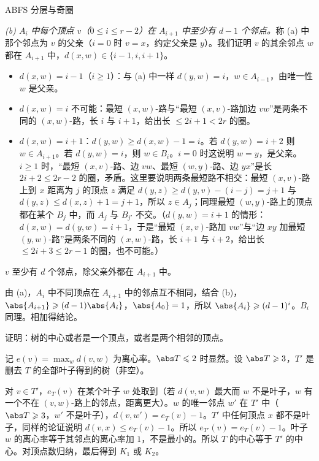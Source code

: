 \begin{exercises}{A}{BFS 分层与奇圈}
\begin{solution}
\emph{(b) $A_i$ 中每个顶点 $v$（$0\leqslant i\leqslant r-2$）在 $A_{i+1}$ 中至少有 $d-1$ 个邻点。}称 (a) 中那个邻点为 $v$ 的父亲（$i=0$ 时 $v=x$，约定父亲是 $y$）。我们证明 $v$ 的其余邻点 $w$ 都在 $A_{i+1}$ 中，$d(x,w)\in\{i-1,i,i+1\}$。
\begin{itemize}
\item $d(x,w)=i-1$（$i\geqslant1$）：与 (a) 中一样 $d(y,w)=i$，$w\in A_{i-1}$，由唯一性 $w$ 是父亲。
\item $d(x,w)=i$ 不可能：最短 $(x,w)$-路与“最短 $(x,v)$-路加边 $vw$”是两条不同的 $(x,w)$-路，长 $i$ 与 $i+1$，给出长 $\leqslant2i+1<2r$ 的圈。
\item $d(x,w)=i+1$：$d(y,w)\geqslant d(x,w)-1=i$。若 $d(y,w)=i+2$ 则 $w\in A_{i+1}$。若 $d(y,w)=i$，则 $w\in B_i$。$i=0$ 时这说明 $w=y$，是父亲。$i\geqslant1$ 时，“最短 $(x,v)$-路、边 $vw$、最短 $(w,y)$-路、边 $yx$”是长 $2i+2\leqslant2r-2$ 的圈，矛盾。这里要说明两条最短路不相交：最短 $(x,v)$-路上到 $x$ 距离为 $j$ 的顶点 $z$ 满足 $d(y,z)\geqslant d(y,v)-(i-j)=j+1$ 与 $d(y,z)\leqslant d(x,z)+1=j+1$，所以 $z\in A_j$；同理最短 $(w,y)$-路上的顶点都在某个 $B_j$ 中，而 $A_j$ 与 $B_{j'}$ 不交。（$d(y,w)=i+1$ 的情形：$d(x,w)=d(y,w)=i+1$，于是“最短 $(x,v)$-路加 $vw$”与“边 $xy$ 加最短 $(y,w)$-路”是两条不同的 $(x,w)$-路，长 $i+1$ 与 $i+2$，给出长 $\leqslant2i+3\leqslant2r-1$ 的圈，也不可能。）
\end{itemize}
$v$ 至少有 $d$ 个邻点，除父亲外都在 $A_{i+1}$ 中。

由 (a)，$A_i$ 中不同顶点在 $A_{i+1}$ 中的邻点互不相同，结合 (b)，$\abs{A_{i+1}}\geqslant(d-1)\abs{A_i}$，$\abs{A_0}=1$，所以 $\abs{A_i}\geqslant(d-1)^i$。$B_i$ 同理。相加得结论。
\end{solution}

\item\label{ex:distance-layers:A4} 证明：树的中心或者是一个顶点，或者是两个相邻的顶点。
\begin{solution}
记 $e(v)=\max_wd(v,w)$ 为离心率。$\abs T\leqslant2$ 时显然。设 $\abs T\geqslant3$，$T'$ 是删去 $T$ 的全部叶子得到的树（非空）。

对 $v\in T'$，$e_T(v)$ 在某个叶子 $w$ 处取到（若 $d(v,w)$ 最大而 $w$ 不是叶子，$w$ 有一个不在 $(v,w)$-路上的邻点，距离更大）。$w$ 的唯一邻点 $w'$ 在 $T'$ 中（$\abs T\geqslant3$，$w'$ 不是叶子），$d(v,w')=e_T(v)-1$。$T'$ 中任何顶点 $x$ 都不是叶子，同样的论证说明 $d(v,x)\leqslant e_T(v)-1$。所以 $e_{T'}(v)=e_T(v)-1$。叶子 $w$ 的离心率等于其邻点的离心率加 $1$，不是最小的。所以 $T$ 的中心等于 $T'$ 的中心。对顶点数归纳，最后得到 $K_1$ 或 $K_2$。
\end{solution}
\end{exercises}
